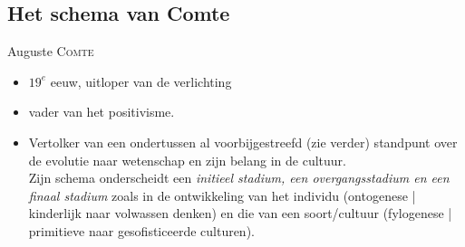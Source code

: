 \documentclass[11pt,a4paper]{article}
\begin{document}
\subsection{Het schema van Comte}
Auguste \textsc{Comte}
\begin{itemize}
\item $19^e$ eeuw, uitloper van de verlichting
\item vader van het positivisme.
\item Vertolker van een ondertussen al voorbijgestreefd (zie verder) standpunt over de evolutie naar wetenschap en zijn belang in de cultuur. \\ Zijn schema onderscheidt een \emph{initieel stadium, een overgangsstadium en een finaal stadium} zoals in de ontwikkeling van het individu (ontogenese | kinderlijk naar volwassen denken) en die van een soort/cultuur (fylogenese | primitieve naar gesofisticeerde culturen).
\end{itemize} 
\end{document}

